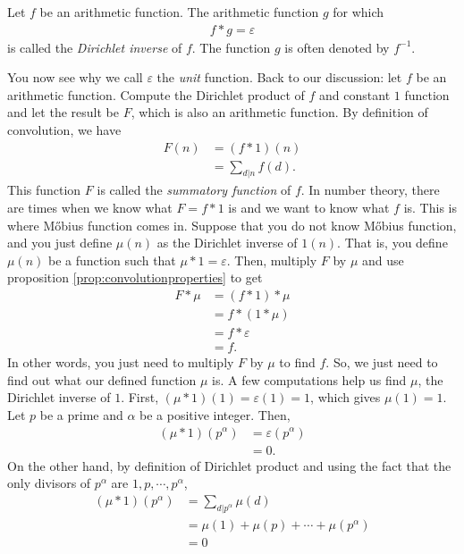 \documentclass[12pt]{subfile}
\begin{document}
		\begin{definition}
			Let $f$ be an arithmetic function. The arithmetic function $g$ for which
				\begin{align*}
					f \ast g = \varepsilon
				\end{align*}
			is called the \textit{Dirichlet inverse} of $f$. The function $g$ is often denoted by $f^{-1}$.
		\end{definition}
	You now see why we call $\varepsilon$ the \textit{unit} function. Back to our discussion: let $f$ be an arithmetic function. Compute the Dirichlet product of $f$ and constant $1$ function and let the result be $F$, which is also an arithmetic function. By definition of convolution, we have
		\begin{align*}
			F(n) &= (f\ast 1)(n)\\
			     &= \sum_{d|n} f(d).
		\end{align*}
	This function $F$ is called the \textit{summatory function} of $f$. In number theory, there are times when we know what $F=f\ast 1$ is and we want to know what $f$ is. This is where M\H obius function comes in. Suppose that you do not know M\H obius function, and you just define $\mu(n)$ as the Dirichlet inverse of $1(n)$. That is, you define $\mu(n)$ be a function such that $\mu \ast 1 = \varepsilon$. Then, multiply $F$ by $\mu$ and use proposition \eqref{prop:convolutionproperties} to get
		\begin{align*}
			F \ast \mu &= (f \ast 1) \ast \mu\\
					   &= f \ast (1 \ast \mu)\\
					   &= f \ast \varepsilon\\
					   &=f.
		\end{align*}
	In other words, you just need to multiply $F$ by $\mu$ to find $f$. So, we just need to find out what our defined function $\mu$ is. A few computations help us find $\mu$, the Dirichlet inverse of $1$. First, $(\mu \ast 1)(1)=\varepsilon(1)=1$, which gives $\mu(1)=1$. Let $p$ be a prime and $\alpha$ be a positive integer. Then,
		\begin{align*}
			(\mu \ast 1)(p^\alpha) &= \varepsilon(p^\alpha)\\
							   &= 0.
		\end{align*}
	On the other hand, by definition of Dirichlet product and using the fact that the only divisors of $p^\alpha$ are $1,p,\cdots,p^\alpha$,
		\begin{align*}
			(\mu \ast 1)(p^\alpha) &= \sum_{d|p^\alpha}\mu(d)\\
							   &= \mu(1) + \mu(p) + \cdots + \mu(p^\alpha)\\
							   &= 0
		\end{align*}
\end{document}
